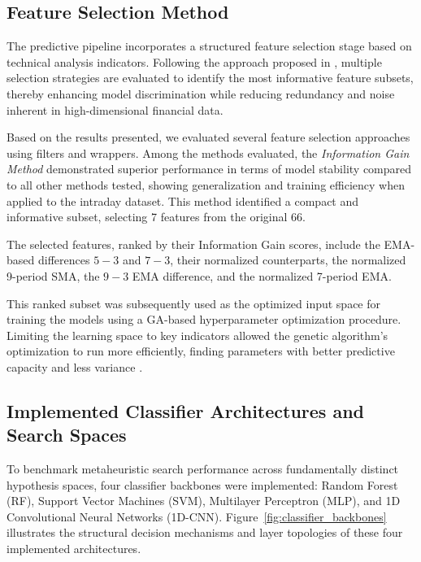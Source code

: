 \subsection{Feature Selection Method}
\label{sec:featureselection}
The predictive pipeline incorporates a structured feature selection stage based on technical analysis indicators. Following the approach proposed in \cite{souza2024dataset}, multiple selection strategies are evaluated to identify the most informative feature subsets, thereby enhancing model discrimination while reducing redundancy and noise inherent in high-dimensional financial data.

Based on the results presented, we evaluated several feature selection approaches using filters and wrappers. Among the methods evaluated, the \textit{Information Gain Method }\cite{lei2012feature} demonstrated superior performance in terms of model stability compared to all other methods tested, showing generalization and training efficiency when applied to the %
intraday dataset. This method identified a compact and informative subset, selecting 7 features from the original 66.

The selected features, ranked by their Information Gain scores, include the EMA-based differences $5\!-\!3$ and $7\!-\!3$, their normalized counterparts, the normalized 9-period SMA, the $9\!-\!3$ EMA difference, and the normalized 7-period EMA. 

This ranked subset was subsequently used as the optimized input space for training the models using a GA-based hyperparameter optimization procedure. Limiting the learning space to key indicators allowed the genetic algorithm's optimization to run more efficiently, finding parameters with better predictive capacity and less variance \cite{kumar2014feature}.

\subsection{Implemented Classifier Architectures and Search Spaces}
\label{sec:classifier_architectures}

To benchmark metaheuristic search performance across fundamentally distinct hypothesis spaces, four classifier backbones were implemented: Random Forest (RF), Support Vector Machines (SVM), Multilayer Perceptron (MLP), and 1D Convolutional Neural Networks (1D-CNN). Figure~\ref{fig:classifier_backbones} illustrates the structural decision mechanisms and layer topologies of these four implemented architectures.



